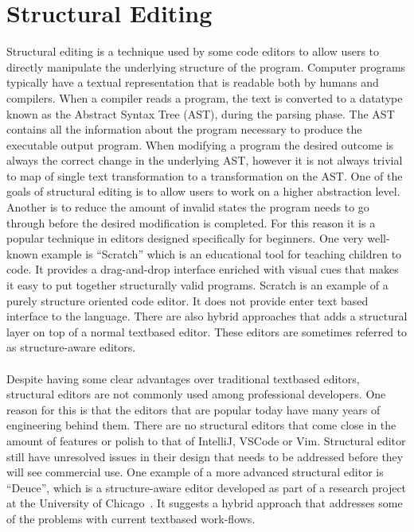 \documentclass[../thesis.tex]{subfiles}
\begin{document}
\section{Structural Editing}
Structural editing is a technique used by some code editors to allow users to directly manipulate the underlying structure of the program.
Computer programs typically have a textual representation that is readable both by humans and compilers.
When a compiler reads a program, the text is converted to a datatype known as the Abstract Syntax Tree (AST), during the parsing phase.
The AST contains all the information about the program necessary to produce the executable output program.
When modifying a program the desired outcome is always the correct change in the underlying AST, however it is not always
trivial to map of single text transformation to a transformation on the AST.
One of the goals of structural editing is to allow users to work on a higher abstraction level.
Another is to reduce the amount of invalid states the program needs to go through
before the desired modification is completed.
For this reason it is a popular technique in editors designed specifically for beginners.
One very well-known example is ``Scratch'' which is an educational tool for teaching children to code.
It provides a drag-and-drop interface enriched with visual cues that makes it easy to
put together structurally valid programs.
Scratch is an example of a purely structure oriented code editor.
It does not provide enter text based interface to the language.
There are also hybrid approaches that adds a structural layer on top of a normal textbased editor.
These editors are sometimes referred to as structure-aware editors.

\paragraph{}

Despite having some clear advantages over traditional textbased editors, structural editors are not commonly used among professional developers.
One reason for this is that the editors that are popular today have many years of engineering behind them.
There are no structural editors that come close in the amount of features or polish to that of IntelliJ, VSCode or Vim.
Structural editor still have unresolved issues in their design that needs to be addressed before they will see commercial use.
One example of a more advanced structural editor is
``Deuce'', which is a structure-aware editor developed as part of a research project at the University of Chicago~\parencite{deuce}.
It suggests a hybrid approach that addresses some of the problems with current textbased work-flows.
\end{document}
